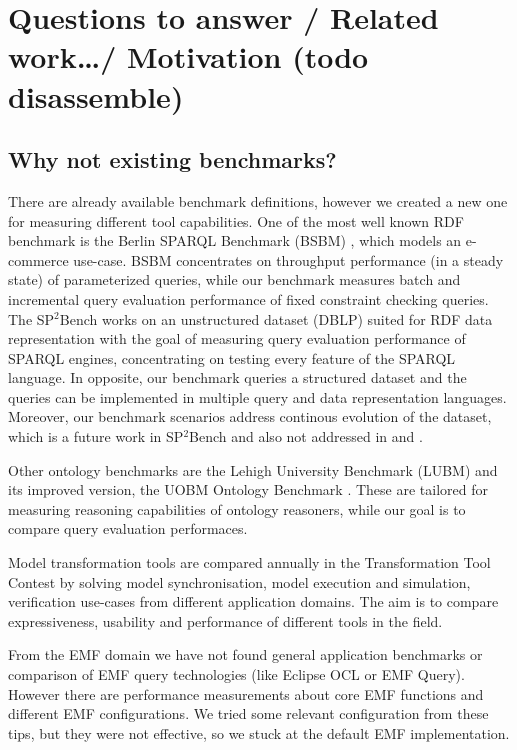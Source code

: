 \section{Questions to answer / Related work\ldots / Motivation (todo disassemble)}

\subsection{Why not existing benchmarks?}

There are already available benchmark definitions, however we created a new one
for measuring different tool capabilities. One of the most well known RDF
benchmark is the Berlin SPARQL Benchmark (BSBM) \cite{BerlinBenchmark}, which
models an e-commerce use-case. BSBM concentrates on throughput performance (in a
steady state) of parameterized queries, while our benchmark measures batch and
incremental query evaluation performance of fixed constraint checking queries.
The SP$^2$Bench \cite{SP2Bench} works on an unstructured dataset (DBLP) suited
for RDF data representation with the goal of measuring query evaluation
performance of SPARQL engines, concentrating on testing every feature of the
SPARQL language. In opposite, our benchmark queries a structured dataset and 
the queries can be implemented in multiple query and data representation languages.
Moreover, our benchmark scenarios address continous evolution of the dataset,
which is a future work in SP$^2$Bench and also not addressed in \cite{SIB} and
\cite{DBpediaSparql}.

Other ontology benchmarks are the Lehigh University Benchmark (LUBM)
\cite{LUBMBenchmark} and its improved version, the UOBM Ontology Benchmark
\cite{UOBM}. These are tailored for measuring reasoning capabilities of ontology
reasoners, while our goal is to compare query evaluation performaces.

Model transformation tools are compared annually in the Transformation Tool
Contest \cite{TTC} by solving model synchronisation, model execution and
simulation, verification use-cases from different application domains. The aim
is to compare expressiveness, usability and performance of different
tools in the field. 

From the EMF domain we have not found general application benchmarks or
comparison of EMF query technologies (like Eclipse OCL or EMF Query). However
there are performance measurements \cite{EMF-performance} about core EMF
functions and different EMF configurations. We tried some relevant
configuration from these tips, but they were not effective, so we stuck at the
default EMF implementation.

